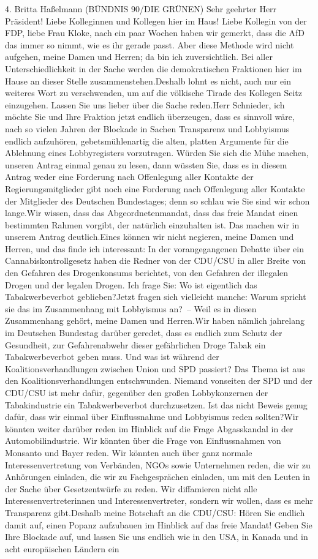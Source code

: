 \documentclass{article}
\begin{document}
	4. Britta Haßelmann (BÜNDNIS 90/DIE GRÜNEN) Sehr geehrter Herr Präsident! Liebe Kolleginnen und Kollegen hier im Haus! Liebe Kollegin von der FDP, liebe Frau Kloke, nach ein paar Wochen haben wir gemerkt, dass die AfD das immer so nimmt, wie es ihr gerade passt. Aber diese Methode wird nicht aufgehen, meine Damen und Herren; da bin ich zuversichtlich. Bei aller Unterschiedlichkeit in der Sache werden die demokratischen Fraktionen hier im Hause an dieser Stelle zusammenstehen.Deshalb lohnt es nicht, auch nur ein weiteres Wort zu verschwenden, um auf die völkische Tirade des Kollegen Seitz einzugehen. Lassen Sie uns lieber über die Sache reden.Herr Schnieder, ich möchte Sie und Ihre Fraktion jetzt endlich überzeugen, dass es sinnvoll wäre, nach so vielen Jahren der Blockade in Sachen Transparenz und Lobbyismus endlich aufzuhören, gebetsmühlenartig die alten, platten Argumente für die Ablehnung eines Lobbyregisters vorzutragen. Würden Sie sich die Mühe machen, unseren Antrag einmal genau zu lesen, dann wüssten Sie, dass es in diesem Antrag weder eine Forderung nach Offenlegung aller Kontakte der Regierungsmitglieder gibt noch eine Forderung nach Offenlegung aller Kontakte der Mitglieder des Deutschen Bundestages; denn so schlau wie Sie sind wir schon lange.Wir wissen, dass das Abgeordnetenmandat, dass das freie Mandat einen bestimmten Rahmen vorgibt, der natürlich einzuhalten ist. Das machen wir in unserem Antrag deutlich.Eines können wir nicht negieren, meine Damen und Herren, und das finde ich interessant: In der vorangegangenen Debatte über ein Cannabiskontrollgesetz haben die Redner von der CDU/CSU in aller Breite von den Gefahren des Drogenkonsums berichtet, von den Gefahren der illegalen Drogen und der legalen Drogen. Ich frage Sie: Wo ist eigentlich das Tabakwerbeverbot geblieben?Jetzt fragen sich vielleicht manche: Warum spricht sie das im Zusammenhang mit Lobbyismus an? – Weil es in diesen Zusammenhang gehört, meine Damen und Herren.Wir haben nämlich jahrelang im Deutschen Bundestag darüber geredet, dass es endlich zum Schutz der Gesundheit, zur Gefahrenabwehr dieser gefährlichen Droge Tabak ein Tabakwerbeverbot geben muss. Und was ist während der Koalitionsverhandlungen zwischen Union und SPD passiert? Das Thema ist aus den Koalitionsverhandlungen entschwunden. Niemand vonseiten der SPD und der CDU/CSU ist mehr dafür, gegenüber den großen Lobbykonzernen der Tabakindustrie ein Tabakwerbeverbot durchzusetzen. Ist das nicht Beweis genug dafür, dass wir einmal über Einflussnahme und Lobbyismus reden sollten?Wir könnten weiter darüber reden im Hinblick auf die Frage Abgasskandal in der Automobilindustrie. Wir könnten über die Frage von Einflussnahmen von Monsanto und Bayer reden. Wir könnten auch über ganz normale Interessenvertretung von Verbänden, NGOs sowie Unternehmen reden, die wir zu Anhörungen einladen, die wir zu Fachgesprächen einladen, um mit den Leuten in der Sache über Gesetzentwürfe zu reden. Wir diffamieren nicht alle Interessenvertreterinnen und Interessenvertreter, sondern wir wollen, dass es mehr Transparenz gibt.Deshalb meine Botschaft an die CDU/CSU: Hören Sie endlich damit auf, einen Popanz aufzubauen im Hinblick auf das freie Mandat! Geben Sie Ihre Blockade auf, und lassen Sie uns endlich wie in den USA, in Kanada und in acht europäischen Ländern ein 
\end{document}
